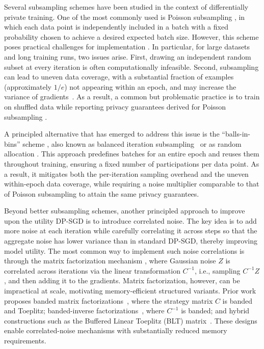\documentclass{article}
\theoremstyle{plain}
\theoremstyle{definition}
\theoremstyle{remark}
\begin{document}
Several subsampling schemes have been studied in the context of differentially private training. One of the most commonly used is Poisson subsampling \citep{abadi2016deep, mironov2017renyi, koskela2020computing, zhu2022optimal}, in which each data point is independently included in a batch with a fixed probability chosen to achieve a desired expected batch size. However, this scheme poses practical challenges for implementation \citep{lebeda2025avoiding, beltran2024towards}. In particular, for large datasets and long training runs, two issues arise. First, drawing an independent random subset at every iteration is often computationally infeasible. Second, subsampling can lead to uneven data coverage, with a substantial fraction of examples (approximately $1/e$) not appearing within an epoch, and may increase the variance of gradients~\cite{feldman2025privacy}. As a result, a common but problematic practice is to train on shuffled data while reporting privacy guarantees derived for Poisson subsampling \citep{lebeda2025avoiding}.

A principled alternative that has emerged to address this issue is the  ``balls-in-bins'' scheme \citep{chua2024balls, choquette2024near}, also known as balanced iteration subsampling~\cite{dong2025leveraging} or as random allocation \citep{feldman2025privacy}. This approach predefines batches for an entire epoch and reuses them throughout training, ensuring a fixed number of participations per data point. As a result, it mitigates both the per-iteration sampling overhead and the uneven within-epoch data coverage, while requiring a noise multiplier comparable to that of Poisson subsampling to attain the same privacy guarantees. 

Beyond better subsampling schemes, another principled approach to improve upon the utility DP-SGD is to introduce correlated noise. The key idea is to add more noise at each iteration while carefully correlating it across steps so that the aggregate noise has lower variance than in standard DP-SGD, thereby improving model utility. The most common way to implement such noise correlations is through the matrix factorization mechanism \citep{li2015matrix, denisov2022improved, choquette2023multi, choquette-choo2023amplified}, where Gaussian noise $Z$ is correlated across iterations via the linear transformation $C^{-1}$, i.e., sampling $C^{-1}Z$, and then adding it to the gradients.
Matrix factorization, however, can be impractical at scale, motivating memory-efficient structured variants. Prior work proposes banded matrix factorizations~\citep{kalinin2024banded, mckenna2024scaling}, where the strategy matrix $C$ is banded and Toeplitz; banded-inverse factorizations~\citep{kalinin2025back}, where $C^{-1}$ is banded; and hybrid constructions such as the Buffered Linear Toeplitz (BLT) matrix~\citep{dvijotham2024efficient, mcmahan2024hassle}. These designs enable correlated-noise mechanisms with substantially reduced memory requirements.
\end{document}
